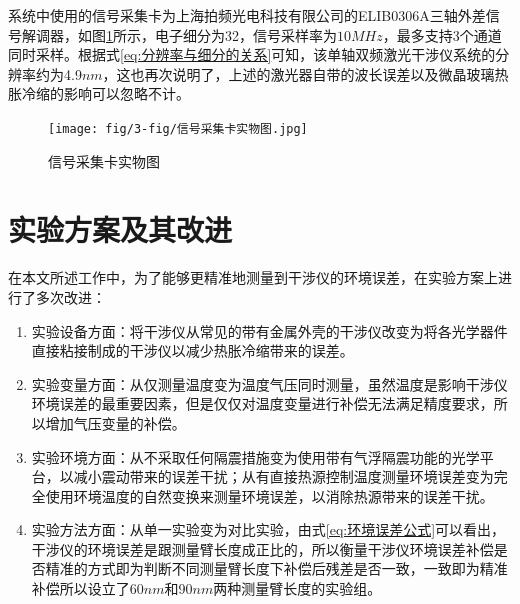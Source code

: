 系统中使用的信号采集卡为上海拍频光电科技有限公司的ELIB0306A三轴外差信号解调器，如图\ref{fig:信号采集卡实物图}所示，电子细分为32，信号采样率为$10MHz$，最多支持3个通道同时采样\cite{信号处理卡}。根据式\eqref{eq:分辨率与细分的关系}可知，该单轴双频激光干涉仪系统的分辨率约为4.9$nm$，这也再次说明了，上述的激光器自带的波长误差以及微晶玻璃热胀冷缩的影响可以忽略不计。
\begin{figure}[htb]
    \centering
    \texttt{[image: fig/3-fig/信号采集卡实物图.jpg]}
    \caption{信号采集卡实物图}
    \label{fig:信号采集卡实物图}
\end{figure}

\section{实验方案及其改进}
在本文所述工作中，为了能够更精准地测量到干涉仪的环境误差，在实验方案上进行了多次改进：
\begin{enumerate}
    \item 实验设备方面：将干涉仪从常见的带有金属外壳的干涉仪改变为将各光学器件直接粘接制成的干涉仪以减少热胀冷缩带来的误差。
    \item 实验变量方面：从仅测量温度变为温度气压同时测量，虽然温度是影响干涉仪环境误差的最重要因素，但是仅仅对温度变量进行补偿无法满足精度要求，所以增加气压变量的补偿。
    \item 实验环境方面：从不采取任何隔震措施变为使用带有气浮隔震功能的光学平台，以减小震动带来的误差干扰；从有直接热源控制温度测量环境误差变为完全使用环境温度的自然变换来测量环境误差，以消除热源带来的误差干扰。
    \item 实验方法方面：从单一实验变为对比实验，由式\eqref{eq:环境误差公式}可以看出，干涉仪的环境误差是跟测量臂长度成正比的，所以衡量干涉仪环境误差补偿是否精准的方式即为判断不同测量臂长度下补偿后残差是否一致，一致即为精准补偿所以设立了60$nm$和90$nm$两种测量臂长度的实验组。
  \end{enumerate}
